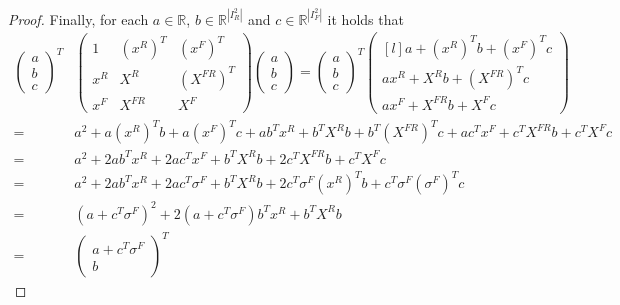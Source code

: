 \documentclass{article}
\begin{document}
\begin{proof}
\newcommand{\myVecE}{a} %
\newcommand{\myVecR}{b} %
\newcommand{\myVecF}{c} %
Finally, for each $\myVecE \in \mathbb{R}$, $\myVecR \in \mathbb R^{|I^2_R|}$ and $\myVecF \in \mathbb R^{|I^2_F|}$ it holds that 
\begingroup
\allowdisplaybreaks
\begin{align*}
    \begin{pmatrix} \myVecE \\ \myVecR \\ \myVecF \end{pmatrix}^T
    &\begin{pmatrix}
        1   & (x^R)^T & (x^F)^T \\
        x^R & X^R   & (X^{FR})^T \\
        x^F & X^{FR} & X^F  \end{pmatrix}
    \begin{pmatrix}\myVecE \\ \myVecR \\ \myVecF \end{pmatrix} 
    = \begin{pmatrix} \myVecE \\ \myVecR \\ \myVecF \end{pmatrix}^T 
    \begin{pmatrix*}[l]
        \myVecE + (x^R)^T \myVecR + (x^F)^T \myVecF \\ 
        \myVecE x^R + X^R \myVecR + (X^{FR})^T \myVecF\\ 
        \myVecE x^F + X^{FR} \myVecR + X^F \myVecF \end{pmatrix*}\\
    = & \myVecE^2 + \myVecE (x^R)^T \myVecR + \myVecE (x^F)^T \myVecF 
     + \myVecE \myVecR^T x^R + \myVecR^T X^R \myVecR + \myVecR^T (X^{FR})^T \myVecF 
     + \myVecE \myVecF^T x^F + \myVecF^T X^{FR} \myVecR + \myVecF^T X^F \myVecF\\
    = & \myVecE^2 + 2 \myVecE \myVecR^T x^R + 2 \myVecE \myVecF^T x^F 
      + \myVecR^T X^R \myVecR + 2 \myVecF^T X^{FR} \myVecR 
      + \myVecF^T X^F \myVecF\\ 
    = & \myVecE^2 + 2 \myVecE \myVecR^T x^R + 2 \myVecE \myVecF^T \sigma^F 
      + \myVecR^T X^R \myVecR + 2 \myVecF^T \sigma^F(x^R)^T \myVecR 
      + \myVecF^T \sigma^F(\sigma^F)^T \myVecF\\ 
    = & (\myVecE + \myVecF^T \sigma^F)^2 + 2 (\myVecE + \myVecF^T \sigma^F) \myVecR^T x^R 
      + \myVecR^T X^R \myVecR \\ 
    = & \begin{pmatrix} \myVecE + \myVecF^T \sigma^F \\ \myVecR \end{pmatrix}^T

\end{align*}
\end{proof}
\end{document}
